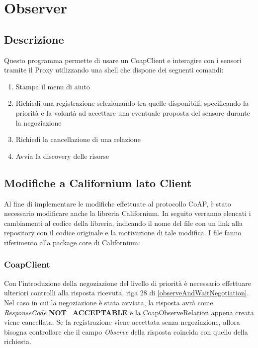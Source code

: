 \chapter{Observer}
	\section {Descrizione}
		Questo programma permette di usare un CoapClient e interagire con i sensori tramite il Proxy utilizzando una shell che dispone dei seguenti comandi:
		\begin{enumerate}
			\item Stampa il menu di aiuto
			\item Richiedi una registrazione selezionando tra quelle disponibili, specificando la priorità e la volontà ad accettare una eventuale proposta del sensore durante la negoziazione
			\item Richiedi la cancellazione di una relazione
			\item Avvia la discovery delle risorse
		\end{enumerate}
	\section {Modifiche a Californium lato Client}
			Al fine di implementare le modifiche effettuate al protocollo CoAP, è stato necessario modificare anche la libreria Californium. In seguito verranno elencati i cambiamenti al codice della libreria, indicando il nome del file con un link alla repository con il codice originale e la motivazione di tale modifica. I file fanno riferimento alla package core di Californium:

			\subsection{CoapClient}\label{CoapClient}
				Con l'introduzione della negoziazione del livello di priorità è necessario effettuare ulteriori controlli alla risposta ricevuta, riga 28 di \ref{observeAndWaitNegotiation}. Nel caso in cui la negoziazione è stata avviata, la risposta avrà come \textit{ResponseCode} \textbf{NOT\_ACCEPTABLE} e la CoapObserveRelation appena creata viene cancellata. Se la registrazione viene accettata senza negoziazione, allora bisogna controllare che il campo \textit{Observe} della risposta coincida con quello della richiesta.\newline
				

